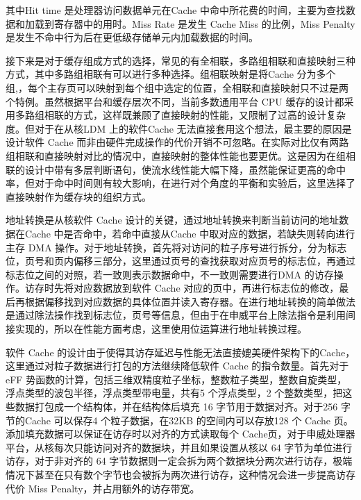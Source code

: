 其中Hit time 是处理器访问数据单元在Cache 中命中所花费的时间，主要为查找数据和加载到寄存器中的用时。Miss Rate 是发生 Cache Miss 的比例，Miss Penalty 是发生不命中行为后在更低级存储单元内加载数据的时间。

接下来是对于缓存组成方式的选择，常见的有全相联，多路组相联和直接映射三种方式，其中多路组相联有可以进行多种选择。组相联映射是将Cache 分为多个组,，每个主存页可以映射到每个组中选定的位置，全相联和直接映射只不过是两个特例。虽然根据平台和缓存层次不同，当前多数通用平台 CPU 缓存的设计都采用多路组相联的方式，这样既兼顾了直接映射的性能，又限制了过高的设计复杂度。但对于在从核LDM 上的软件Cache 无法直接套用这个想法，最主要的原因是设计软件 Cache 而非由硬件完成操作的代价开销不可忽略。在实际对比仅有两路组相联和直接映射对比的情况中，直接映射的整体性能也要更优。这是因为在组相联的设计中带有多层判断语句，使流水线性能大幅下降，虽然能保证更高的命中率，但对于命中时间则有较大影响，在进行对个角度的平衡和实验后，这里选择了直接映射作为缓存块的组织方式。

地址转换是从核软件 Cache 设计的关键，通过地址转换来判断当前访问的地址数据在Cache 中是否命中，若命中直接从Cache 中取对应的数据，若缺失则转向进行主存 DMA 操作。对于地址转换，首先将对访问的粒子序号进行拆分，分为标志位，页号和页内偏移三部分，这里通过页号的查找获取对应页号的标志位，再通过标志位之间的对照，若一致则表示数据命中，不一致则需要进行DMA 的访存操作。访存时先将对应数据放到软件 Cache 对应的页中，再进行标志位的修改，最后再根据偏移找到对应数据的具体位置并读入寄存器。在进行地址转换的简单做法是通过除法操作找到标志位，页号等信息，但由于在申威平台上除法指令是利用间接实现的，所以在性能方面考虑，这里使用位运算进行地址转换过程。

软件 Cache 的设计由于使得其访存延迟与性能无法直接媲美硬件架构下的Cache，这里通过对粒子数据进行打包的方法继续降低软件 Cache 的指令数量。首先对于 eFF 势函数的计算，包括三维双精度粒子坐标，整数粒子类型，整数自旋类型，浮点类型的波包半径，浮点类型带电量，共有5 个浮点类型，2 个整数类型，把这些数据打包成一个结构体，并在结构体后填充 16 字节用于数据对齐。对于256 字节的Cache 可以保存4 个粒子数据，在32KB 的空间内可以存放128 个 Cache 页。添加填充数据可以保证在访存时以对齐的方式读取每个 Cache页，对于申威处理器平台，从核每次只能访问对齐的数据块，并且如果设置从核以 64 字节为单位进行访存，对于非对齐的 64 字节数据则一定会拆为两个数据块分两次进行访存，极端情况下甚至在只有数个字节也会被拆为两次进行访存，这种情况会进一步提高访存代价 Miss Penalty，并占用额外的访存带宽。

